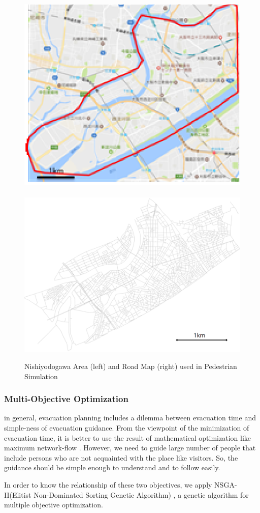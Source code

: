 \begin{figure}
  \centering
  \includegraphics[width=.49\linewidth]{Figs.noda/figure-08.nishiyodogawa.eps}~
  \includegraphics[width=0.49\linewidth]{Figs.noda/yodogawa_map}
  \caption{Nishiyodogawa Area (left) and
    Road Map (right) used in Pedestrian Simulation}
  \label{fig:Figs.noda/figure-08.nishiyodogawa.eps}
\end{figure}

\subsubsection{Multi-Objective Optimization}
\label{sss:moea}

in general, evacuation planning includes a dilemma
between evacuation time and simple-ness of evacuation guidance.
From the viewpoint of the minimization of evacuation time,
it is better to use the result of mathematical optimization
like maximum network-flow \cite{kobayashi:2016}.
However, we need to guide large number of people that include
persons who are not acquainted with the place like visitors.
So, the guidance should be simple enough to understand and to follow easily.


In order to know the relationship of these two objectives,
we apply NSGA-II(Elitist Non-Dominated Sorting Genetic Algorithm)
\cite{deb:nsga}, a genetic algorithm for
multiple objective optimization.


